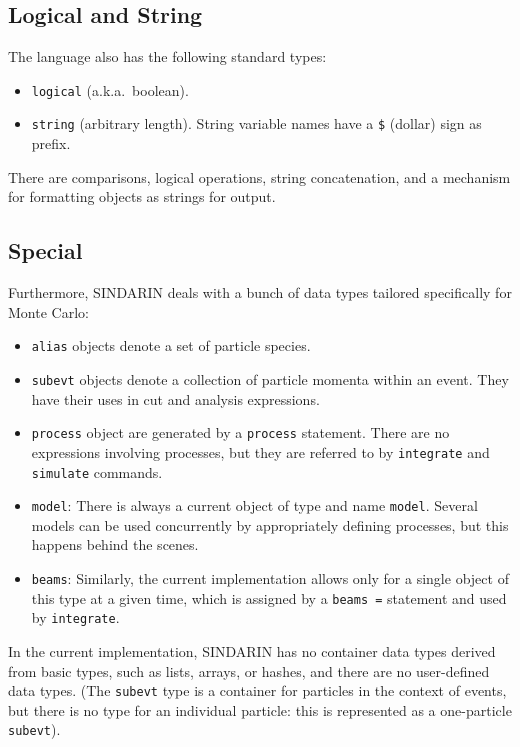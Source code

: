 \documentclass[12pt]{book}
\newcommand{\ttt}[1]{\texttt{#1}}
\begin{document}
\subsection{Logical and String}

The language also has the following standard types:
\begin{itemize}
\item
   \ttt{logical} (a.k.a.\ boolean).
\item
   \ttt{string} (arbitrary length).  String variable names have a \ttt{\$}
   (dollar) sign as prefix.
\end{itemize}
There are comparisons, logical operations, string concatenation, and a
mechanism for formatting objects as strings for output.


\subsection{Special}

Furthermore, SINDARIN deals with a bunch of data types tailored
specifically for Monte Carlo:
\begin{itemize}
\item
  \ttt{alias} objects denote a set of particle species.
\item
  \ttt{subevt} objects denote a collection of particle momenta within an
  event.  They have their uses in cut and analysis expressions.
\item
  \ttt{process} object are generated by a \ttt{process} statement.
  There are no expressions involving processes, but they are referred
  to by \ttt{integrate} and \ttt{simulate} commands.
\item
  \ttt{model}: There is always a current object of type and name
  \ttt{model}.  Several models can be used concurrently by
  appropriately defining processes, but this happens behind the scenes.
\item
  \ttt{beams}: Similarly, the current implementation allows only for a single
  object of this type at a given time, which is assigned by a \ttt{beams =}
  statement and used by \ttt{integrate}.
\end{itemize}

In the current implementation, SINDARIN has no container data types
derived from basic types, such as lists, arrays, or hashes, and there
are no user-defined data types.  (The \ttt{subevt} type is a container
for particles in the context of events, but there is no type for an
individual particle: this is represented as a one-particle
\ttt{subevt}).
\end{document}
